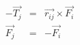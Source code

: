 \documentclass[12pt]{article}
\begin{document}
\begin{eqnarray*}
-\vec{T_j} & = & \vec{r_{ij}} \times \vec{F_i}\\
\vec{F_j} & = & -\vec{F_i} \\
\end{eqnarray*}                           
\end{document}
